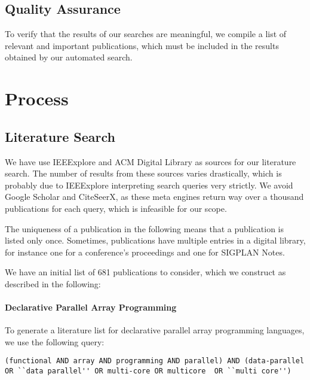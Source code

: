 \documentclass[a4paper]{article}
\begin{document}
\subsection{Quality Assurance}
\label{sec:quality-assurance}

To verify that the results of our searches are meaningful, we compile
a list of relevant and important publications, which must be included
in the results obtained by our automated search.

\section{Process}
\label{sec:process}

\subsection{Literature Search}
\label{sec:literature-search}

We have use IEEExplore and ACM Digital Library as sources for our
literature search. The number of results from these sources varies
drastically, which is probably due to IEEExplore interpreting search
queries very strictly. We avoid Google Scholar and CiteSeerX, as these
meta engines return way over a thousand publications for each query,
which is infeasible for our scope.

The uniqueness of a publication in the following means that a
publication is listed only once. Sometimes, publications have multiple
entries in a digital library, for instance one for a conference's
proceedings and one for SIGPLAN Notes.

We have an initial list of 681 publications to consider, which we
construct as described in the following:

\paragraph{Declarative Parallel Array Programming}

To generate a literature list for declarative parallel array
programming languages, we use the following query:

\begin{lstlisting}
(functional AND array AND programming AND parallel) AND (data-parallel OR ``data parallel'' OR multi-core OR multicore  OR ``multi core'')
\end{lstlisting}
\end{document}
